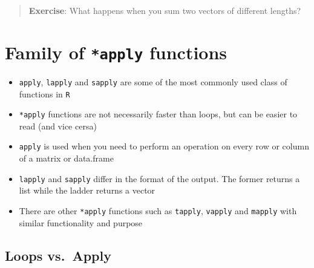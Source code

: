 \documentclass[]{book}
\providecommand{\tightlist}{%
  \setlength{\itemsep}{0pt}\setlength{\parskip}{0pt}}
\providecommand{\tightlist}{%
  \setlength{\itemsep}{0pt}\setlength{\parskip}{0pt}}
\theoremstyle{definition}
\theoremstyle{definition}
\theoremstyle{definition}
\theoremstyle{remark}
\begin{document}
\begin{quote}
\textbf{Exercise}: What happens when you sum two vectors of different
lengths?
\end{quote}

\section{\texorpdfstring{Family of \texttt{*apply}
functions}{Family of *apply functions}}\label{family-of-apply-functions}

\begin{itemize}
\tightlist
\item
  \texttt{apply}, \texttt{lapply} and \texttt{sapply} are some of the
  most commonly used class of functions in \texttt{R}
\item
  \texttt{*apply} functions are not necessarily faster than loops, but
  can be easier to read (and vice cersa)
\item
  \texttt{apply} is used when you need to perform an operation on every
  row or column of a matrix or data.frame
\item
  \texttt{lapply} and \texttt{sapply} differ in the format of the
  output. The former returns a list while the ladder returns a vector
\item
  There are other \texttt{*apply} functions such as \texttt{tapply},
  \texttt{vapply} and \texttt{mapply} with similar functionality and
  purpose
\end{itemize}

\subsection{Loops vs.~Apply}\label{loops-vs.apply}
\end{document}
